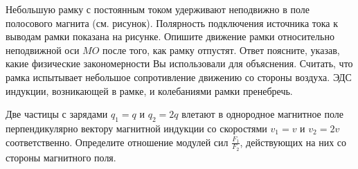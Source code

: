 \begin{taskbasic}[code={\label{task:elem_mag_frame_magnet_rotation}}]
Небольшую рамку с постоянным током удерживают неподвижно в поле полосового магнита (см. рисунок). Полярность подключения источника тока к выводам рамки показана на рисунке. Опишите движение рамки относительно неподвижной оси $MO$ после того, как рамку отпустят. Ответ поясните, указав, какие физические закономерности Вы использовали для объяснения. Считать, что рамка испытывает небольшое сопротивление движению со стороны воздуха. ЭДС индукции, возникающей в рамке, и колебаниями рамки пренебречь.

\nopagebreak\smallskip
\begin{center}
\end{center}

\end{taskbasic}

\begin{taskbasic}[code={\label{task:elem_mag_particles_ratio_q2q_v2v}}]
Две частицы с зарядами $q_1 = q$ и $q_2 = 2q$ влетают в однородное магнитное поле перпендикулярно вектору магнитной индукции со скоростями $v_1 = v$ и $v_2 = 2v$ соответственно. Определите отношение модулей сил $\frac{F_1}{F_2}$, действующих на них со стороны магнитного поля.

\end{taskbasic}

